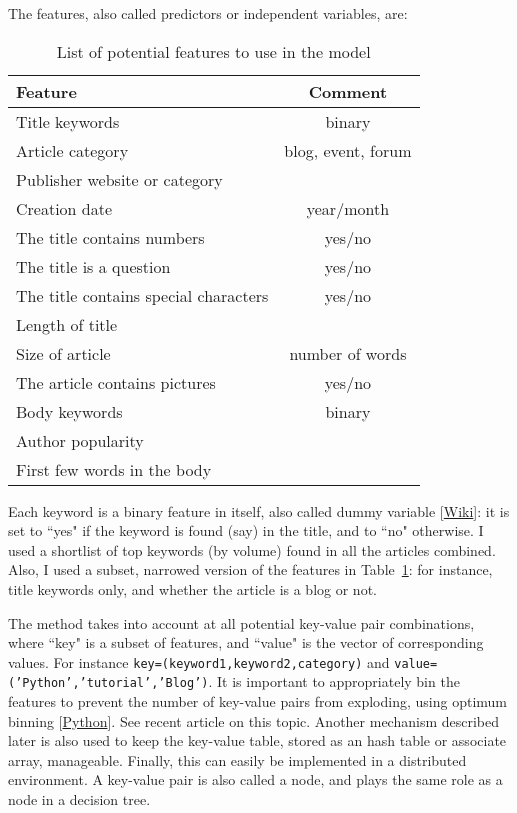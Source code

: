 \documentclass[oneside,10pt]{book}
\renewcommand{\arraystretch}{1.4} %
\begin{document}
The features, also called predictors or independent variables, are:\vspace{1ex} 

\renewcommand{\arraystretch}{1.2} %

\begin{table}%
\begin{center}
\small
\begin{tabular}{lc}
\hline
   Feature & Comment \\
\hline
Title keywords &  binary\\
Article category & blog, event, forum\\
Publisher website or category & \\
Creation date & year/month\\
The title contains numbers & yes/no\\
The title is a question & yes/no \\
The title contains special characters & yes/no \\
Length of title & \\
Size of article & number of words \\
The article contains pictures & yes/no\\
Body keywords & binary \\
Author popularity & \\
First few words in the body & \\
\hline
\end{tabular}
\caption{\label{fffdsa}List of potential features to use in the model}
\end{center}
\end{table}
\renewcommand{\arraystretch}{1.0} %


\noindent Each keyword is a binary feature in itself, also called \textcolor{index}{dummy variable} [\href{https://en.wikipedia.org/wiki/Dummy_variable_(statistics)}{Wiki}]: it is set to ``yes" if the keyword is found (say) in the title, and to ``no" otherwise. I used
 a shortlist of top keywords (by volume) found in all the articles combined. Also, I used a subset, narrowed version  
of the features in Table~\ref{fffdsa}: for instance, title keywords only, and whether the article is a blog or not.

 The method takes into account at all potential \textcolor{index}{key-value pair} combinations, where ``key" is a subset of features, and ``value" is the vector of corresponding values.
For instance \texttt{key=(keyword1,keyword2,category)} and \texttt{value=('Python','tutorial','Blog')}. It is important to appropriately bin the features 
 to prevent the number of key-value pairs from exploding, using \textcolor{index}{optimum binning} [\href{http://gnpalencia.org/optbinning/}{Python}]. 
See recent article \cite{binh2020} on this topic. Another mechanism described later  is also used to keep the key-value table, stored as an hash table or associate array, manageable. Finally, this can easily be implemented in a distributed environment.
A key-value pair is also called a \textcolor{index}{node}, and plays the same role as a node in a decision tree. 
\end{document}
